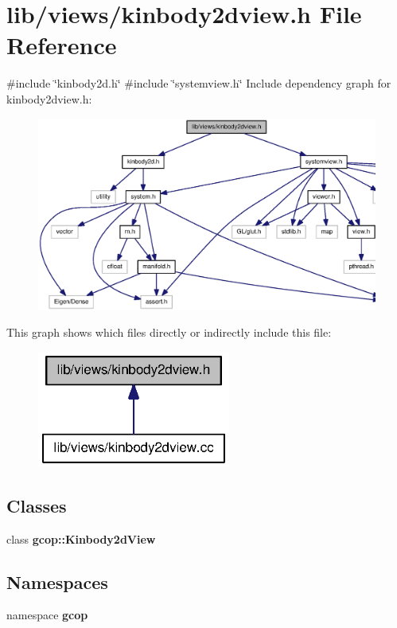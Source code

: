 \section{lib/views/kinbody2dview.h \-File \-Reference}
\label{kinbody2dview_8h}
{\ttfamily \#include \char`\"{}kinbody2d.\-h\char`\"{}}\*
{\ttfamily \#include \char`\"{}systemview.\-h\char`\"{}}\*
\-Include dependency graph for kinbody2dview.\-h\-:\nopagebreak
\begin{figure}[H]
\begin{center}
\leavevmode
\includegraphics[width=350pt]{kinbody2dview_8h__incl}
\end{center}
\end{figure}
\-This graph shows which files directly or indirectly include this file\-:\nopagebreak
\begin{figure}[H]
\begin{center}
\leavevmode
\includegraphics[width=180pt]{kinbody2dview_8h__dep__incl}
\end{center}
\end{figure}
\subsection*{\-Classes}
\begin{DoxyCompactItemize}
\item 
class {\bf gcop\-::\-Kinbody2d\-View}
\end{DoxyCompactItemize}
\subsection*{\-Namespaces}
\begin{DoxyCompactItemize}
\item 
namespace {\bf gcop}
\end{DoxyCompactItemize}
